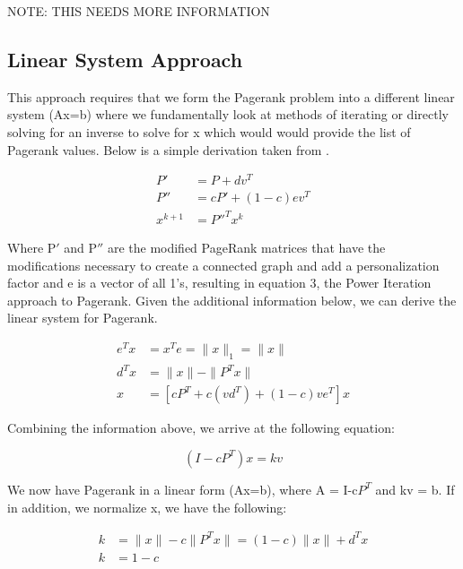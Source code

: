 \documentclass[letterpaper,12pt,onecolumn]{article}
\begin{document}
NOTE: THIS NEEDS MORE INFORMATION 

\subsection{Linear System Approach}
This approach requires that we form the Pagerank problem into a different linear system (Ax=b) where we fundamentally look at methods of iterating or directly solving for an inverse to solve for x which would would provide the list of Pagerank values. Below is a simple derivation taken from \cite{Fast Parallel}.
\begin{center}
\begin{align}
	P' &= P + dv^{T} \\
	P'' &= cP' + (1-c)ev^{T} \\
	x^{k+1} &= P''^{T}x^{k}
\end{align}

\end{center}
Where P$'$ and P$''$ are the modified PageRank matrices that have the modifications necessary to create a connected graph and add a personalization factor and e is a vector of all 1's, resulting in equation 3, the Power Iteration approach to Pagerank.
\newline
\linebreak
Given the additional information below, we can derive the linear system for Pagerank.


\begin{center}
\begin{align}
  e^{T}x & = x^{T}e = \|x\|_{1} = \|x\| \\
  d^{T}x &= \| x\| - \| P^{T}x\| \\
  x &= [cP^{T} + c(vd^{T}) + (1-c)ve^{T}]x
\end{align}
\end{center}

Combining the information above, we arrive at the following equation:

\begin{center}
\begin{equation}
  (I-cP^{T})x = kv
\end{equation}
\end{center}
We now have Pagerank in a linear form (Ax=b), where A = I-c$P^{T}$ and kv = b. If in addition, we normalize x, we have the following:

\begin{center}
  \begin{align}
	k &= \|x\| - c \|P^{T}x\| = (1-c) \|x\| + d^{T}x \\	
	k &= 1-c 
  \end{align}
\end{center}
\end{document}
